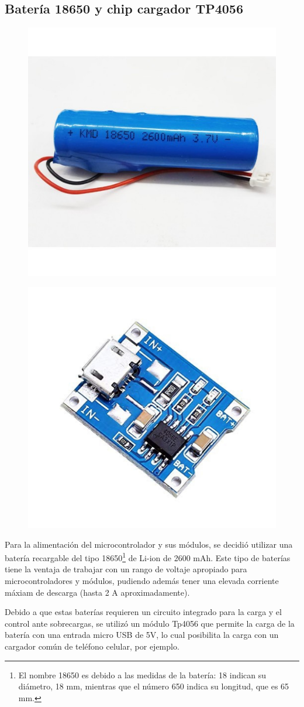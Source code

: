 \subsection{Batería 18650 y chip cargador TP4056}

\begin{figure}[H]
\centering
\begin{minipage}{.5\textwidth}
  \centering
  \includegraphics[width=.4\linewidth]{./Figures/18650.jpg}
  \label{fig:test1}
\end{minipage}%
\begin{minipage}{.5\textwidth}
  \centering
  \includegraphics[width=.4\linewidth]{./Figures/tp4056.jpg}
  \label{fig:test2}
\end{minipage}
\end{figure}

Para la alimentación del microcontrolador y sus módulos, se decidió utilizar una batería recargable del tipo 18650\footnote{El nombre 18650 es debido a las medidas de la batería: 18 indican su diámetro, 18 mm, mientras que el número 650 indica su longitud, que es 65 mm.} de Li-ion de 2600 mAh. Este tipo de baterías tiene la ventaja de trabajar con un rango de voltaje apropiado para microcontroladores y módulos, pudiendo además tener una elevada corriente máxiam de descarga (hasta 2 A aproximadamente).

Debido a que estas baterías requieren un circuito integrado para la carga y el control ante sobrecargas, se utilizó un módulo Tp4056 que permite la carga de la batería con una entrada micro USB de 5V, lo cual posibilita la carga con un cargador común de teléfono celular, por ejemplo.

